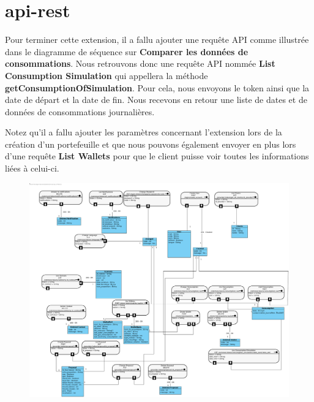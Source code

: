 \section{api-rest}

\begin{flushleft}
Pour terminer cette extension, il a fallu ajouter une requête API comme illustrée dans le diagramme de séquence sur \textbf{Comparer les données de consommations}. Nous retrouvons donc une requête API nommée \textbf{List Consumption Simulation} qui appellera la méthode \textbf{getConsumptionOfSimulation}. Pour cela, nous envoyons le token ainsi que la date de départ et la date de fin. Nous recevons en retour une liste de dates et de données de consommations journalières.
\end{flushleft}

\begin{flushleft}
Notez qu'il a fallu ajouter les paramètres concernant l'extension lors de la création d'un portefeuille et que nous pouvons également envoyer en plus lors d'une requête \textbf{List Wallets} pour que le client puisse voir toutes les informations liées à celui-ci.
\end{flushleft}

\begin{figure}[h]
\centering
\includegraphics[width=1.3\textwidth]{extension-adrien/Api-rest/img/apirest.png}
\end{figure}
